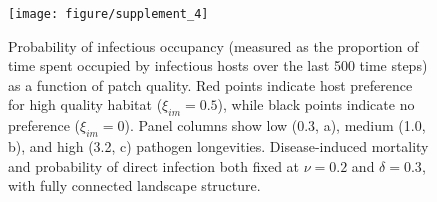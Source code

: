 \documentclass{article}
\begin{document}
\begin{figure}
\texttt{[image: figure/supplement\_4]}
\centering
\caption{Probability of infectious occupancy (measured as the proportion of time spent occupied by infectious hosts over the last 500 time steps) as a function of patch quality. Red points indicate host preference for high quality habitat ($\xi_{im} = 0.5$), while black points indicate no preference ($\xi_{im} = 0$). Panel columns show low (0.3, a), medium (1.0, b), and high (3.2, c) pathogen longevities.  Disease-induced mortality and probability of direct infection both fixed at $\nu = 0.2$ and $\delta = 0.3$, with fully connected landscape structure.}
\end{figure}
\end{document}
